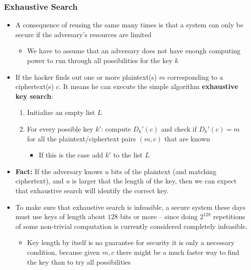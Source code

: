 \documentclass[11pt]{article}
\begin{document}
\subsubsection{Exhaustive Search}
\label{sec:orgb3595c4}
\begin{itemize}
\item A consequence of reusing the same many times is that a system can only be secure if the adversary's resources are limited
\begin{itemize}
\item We have to assume that an adversary does not have enough computing power to run through all possibilities for the key \(k\)
\end{itemize}

\item If the hacker finds out one or more plaintext(s) \(m\) corresponding to a ciphertext(s) \(c\). It means he can execute the simple algorithm \textbf{exhaustive key search}:
\begin{enumerate}
\item Initialize an empty list \(L\)
\item For every possible key \(k'\): compute \(D_k'(c)\) and check if \(D_k'(c)=m\) for all the plaintext/ciphertext pairs \((m,c)\) that are known
\begin{itemize}
\item If this is the case add \(k'\) to the list \(L\)
\end{itemize}
\end{enumerate}

\item \textbf{Fact:} If the adversary knows \(u\) bits of the plaintext (and matching ciphertext), and \(u\) is larger that the length of the key, then we can expect that exhaustive search will identify the correct key.

\item To make sure that exhaustive search is infeasible, a secure system these days must use keys of length about \(128\) bits or more – since doing \(2^{128}\) repetitions of some non-trivial computation is currently considered completely infeasible.
\begin{itemize}
\item Key length by itself is no guarantee for security it is only a necessary condition, because given \(m,c\) there might be a much faster way to find the key than to try all possibilities
\end{itemize}


\end{itemize}
\end{document}

